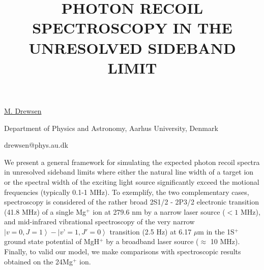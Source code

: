 \title{PHOTON RECOIL SPECTROSCOPY IN THE UNRESOLVED SIDEBAND LIMIT}

\underline{M. Drewsen} 

{\normalsize{\vspace{-4mm}
Department of Physics and Astronomy,
Aarhus University,
Denmark




\email drewsen@phys.au.dk}}

We present a general framework for simulating the expected photon recoil spectra in unresolved sideband limits where either the natural line width of a target ion or the spectral width of the exciting light source significantly exceed the motional frequencies (typically 0.1-1 MHz). To exemplify, the two complementary cases, spectroscopy is considered of the rather broad 2S1/2 - 2P3/2 electronic transition (41.8 MHz) of a single Mg$^+$ ion at 279.6 nm by a narrow laser source ($< 1$ MHz), and mid-infrared vibrational spectroscopy of the very narrow $\left|v = 0, J = 1\right\rangle - \left|v’= 1, J' = 0\right\rangle$ transition (2.5 Hz) at 6.17 $\mu$m in the 1S$^+$ ground state potential of MgH$^+$ by a broadband laser source ($\approx$ 10 MHz). Finally, to valid our model, we make comparisons with spectroscopic results obtained on the 24Mg$^+$ ion.

\vspace{\baselineskip}
